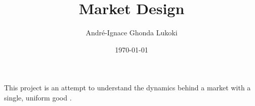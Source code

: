 \documentclass{article}
\title{Market Design}
\author{André-Ignace Ghonda Lukoki}
\date{\today}
\begin{document}
\maketitle

This project is an attempt to understand the dynamics behind a market with a single, uniform good \cite{Ohara86}.

\pagebreak
 

\end{document}
